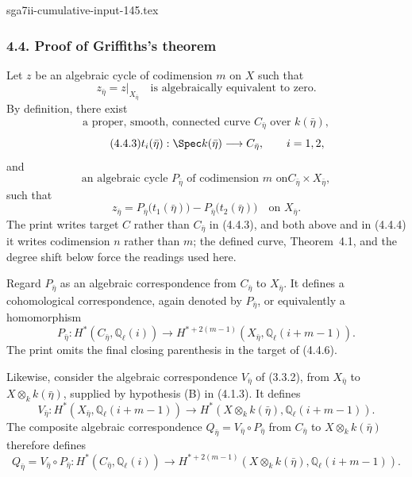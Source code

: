 \begin{filecontents*}{sga7ii-cumulative-input-145.tex}
\subsubsection*{4.4. Proof of Griffiths's theorem}

Let $z$ be an algebraic cycle of codimension $m$ on $X$ such that
\begin{equation}\tag{4.4.1}
z_{\bar\eta}=z|_{X_{\bar\eta}}
\quad\text{is algebraically equivalent to zero}.
\end{equation}
By definition, there exist
\begin{equation}\tag{4.4.2}
\text{a proper, smooth, connected curve $C_{\bar\eta}$ over $k(\bar\eta)$},
\end{equation}
\begin{equation}\tag{4.4.3}
t_i(\bar\eta):\Spec k(\bar\eta)\longrightarrow C_{\bar\eta},
\qquad i=1,2,
\end{equation}
and
\begin{equation}\tag{4.4.4}
\text{an algebraic cycle $P_{\bar\eta}$ of codimension $m$ on
$C_{\bar\eta}\times X_{\bar\eta}$},
\end{equation}
such that
\begin{equation}\tag{4.4.5}
z_{\bar\eta}
=P_{\bar\eta}\bigl(t_1(\bar\eta)\bigr)
-P_{\bar\eta}\bigl(t_2(\bar\eta)\bigr)
\quad\text{on }X_{\bar\eta}.
\end{equation}
The print writes target $C$ rather than $C_{\bar\eta}$ in (4.4.3), and
both above and in (4.4.4) it writes codimension $n$ rather than $m$;
the defined curve, Theorem~4.1, and the degree shift below force the
readings used here.

Regard $P_{\bar\eta}$ as an algebraic correspondence from
$C_{\bar\eta}$ to $X_{\bar\eta}$.  It defines a cohomological
correspondence, again denoted by $P_{\bar\eta}$, or equivalently a
homomorphism
\begin{equation}\tag{4.4.6}
P_{\bar\eta}:H^*(C_{\bar\eta},\mathbb Q_\ell(i))
\longrightarrow
H^{*+2(m-1)}(X_{\bar\eta},\mathbb Q_\ell(i+m-1)).
\end{equation}
The print omits the final closing parenthesis in the target of (4.4.6).

Likewise, consider the algebraic correspondence $V_{\bar\eta}$ of
(3.3.2), from $X_{\bar\eta}$ to $X\otimes_k k(\bar\eta)$, supplied by
hypothesis (B) in (4.1.3).  It defines
\begin{equation}\tag{4.4.7}
V_{\bar\eta}:H^*(X_{\bar\eta},\mathbb Q_\ell(i+m-1))
\longrightarrow
H^*(X\otimes_k k(\bar\eta),\mathbb Q_\ell(i+m-1)).
\end{equation}
The composite algebraic correspondence
$Q_{\bar\eta}=V_{\bar\eta}\circ P_{\bar\eta}$ from $C_{\bar\eta}$ to
$X\otimes_k k(\bar\eta)$ therefore defines
\begin{equation}\tag{4.4.8}
Q_{\bar\eta}=V_{\bar\eta}\circ P_{\bar\eta}:
H^*(C_{\bar\eta},\mathbb Q_\ell(i))
\longrightarrow
H^{*+2(m-1)}(X\otimes_k k(\bar\eta),\mathbb Q_\ell(i+m-1)).
\end{equation}


\end{filecontents*}
